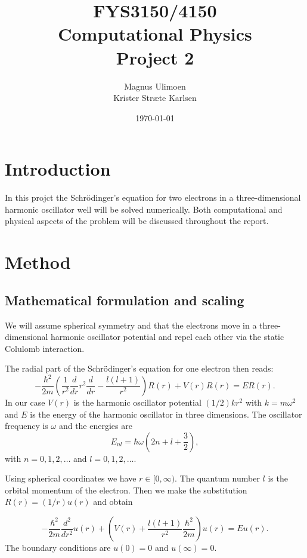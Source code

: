 \documentclass[11pt,a4paper,english]{article}
\title{FYS3150/4150\\Computational Physics\\Project 2}
\author{Magnus Ulimoen\\Krister Stræte Karlsen}
\date{\today}
\numberwithin{equation}{section}
\begin{document}
\maketitle

\section{Introduction}

In this projct the Schr\"odinger's equation for two electrons in a three-dimensional harmonic oscillator well will be solved numerically. Both computational and physical aspects of the problem will be discussed throughout the report. 


\section{Method}

\subsection{Mathematical formulation and scaling}

We will assume spherical symmetry and that the electrons move in a three-dimensional harmonic
oscillator potential and repel  each other via the static Colulomb interaction.  

The radial part of the Schr\"odinger's equation for one electron then reads:
\[
  -\frac{\hbar^2}{2 m} \left ( \frac{1}{r^2} \frac{d}{dr} r^2
  \frac{d}{dr} - \frac{l (l + 1)}{r^2} \right )R(r) 
     + V(r) R(r) = E R(r).
\]
In our case $V(r)$ is the harmonic oscillator potential $(1/2)kr^2$ with
$k=m\omega^2$ and $E$ is
the energy of the harmonic oscillator in three dimensions.
The oscillator frequency is $\omega$ and the energies are
\[
E_{nl}=  \hbar \omega \left(2n+l+\frac{3}{2}\right),
\]
with $n=0,1,2,\dots$ and $l=0,1,2,\dots$.
 
Using spherical coordinates we have $r\in [0,\infty)$. The quantum number
$l$ is the orbital momentum of the electron.
Then we make the substitution $R(r) = (1/r) u(r)$ and obtain

\[
  -\frac{\hbar^2}{2 m} \frac{d^2}{dr^2} u(r) 
       + \left ( V(r) + \frac{l (l + 1)}{r^2}\frac{\hbar^2}{2 m}
                                    \right ) u(r)  = E u(r) .
\]
%
The boundary conditions are $u(0)=0$ and $u(\infty)=0$.
\end{document}
